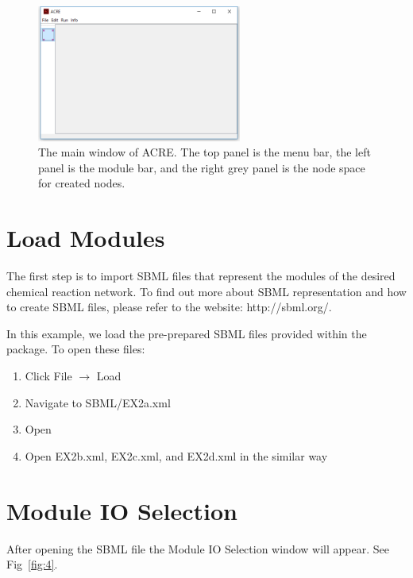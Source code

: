\documentclass{report}
\begin{document}
\begin{figure}
	\centering
		\includegraphics[width=0.6\textwidth]{3}
	\caption{The main window of ACRE. The top panel is the menu bar, the left panel is the
module bar, and the right grey panel is the node space for created nodes.}
	\label{fig:3}
\end{figure}

\section{Load Modules}

The first step is to import SBML files that represent the modules of the desired chemical
reaction network. To find out more about SBML representation and how to create SBML files,
please refer to the website: http://sbml.org/.


In this example, we load the pre-prepared SBML files provided within the package. To open
these files:

\begin{enumerate}
	\item Click File $\rightarrow$ Load
	\item Navigate to SBML/EX2a.xml
	\item Open
	\item Open EX2b.xml, EX2c.xml, and EX2d.xml in the similar way
\end{enumerate}

\section{Module IO Selection}
After opening the SBML file the Module IO Selection window will appear. See Fig~\ref{fig:4}.
\end{document}
